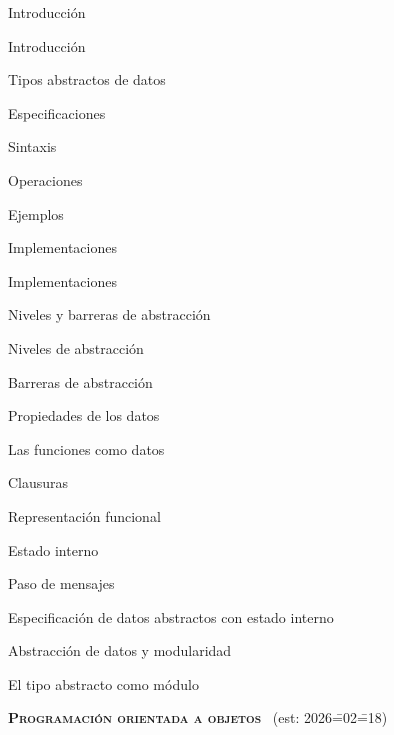 \begin{longenum}
\begin{longenum}
        \item Introducción
        \begin{longenum}
            \item Introducción
            \item Tipos abstractos de datos
        \end{longenum}
        \item Especificaciones
        \begin{longenum}
            \item Sintaxis
            \item Operaciones
            \item Ejemplos
        \end{longenum}
        \item Implementaciones
        \begin{longenum}
            \item Implementaciones
        \end{longenum}
        \item Niveles y barreras de abstracción
        \begin{longenum}
            \item Niveles de abstracción
            \item Barreras de abstracción
            \item Propiedades de los datos
        \end{longenum}
        \item Las funciones como datos
        \begin{longenum}
            \item Clausuras
            \item Representación funcional
            \item Estado interno
            \item Paso de mensajes
            \item Especificación de datos abstractos con estado interno
        \end{longenum}
        \item Abstracción de datos y modularidad
        \begin{longenum}
            \item El tipo abstracto como módulo
        \end{longenum}
    \end{longenum}
    \item \textbf{\textsc{Programación orientada a objetos}} \ (est: 2026\==02\==18)

\end{longenum}
